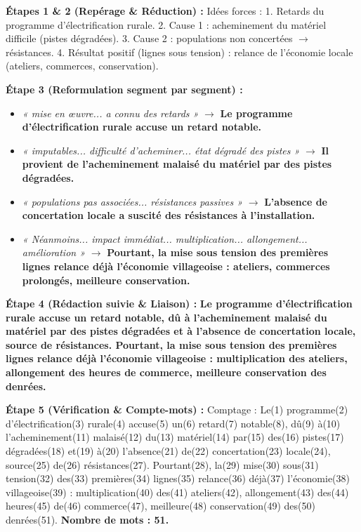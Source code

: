 \documentclass[11pt]{article}
\begin{document}
\begin{corrige}
\textbf{Étapes 1 \& 2 (Repérage \& Réduction) :}
Idées forces : 1. Retards du programme d'électrification rurale. 2. Cause 1 : acheminement du matériel difficile (pistes dégradées). 3. Cause 2 : populations non concertées $\rightarrow$ résistances. 4. Résultat positif (lignes sous tension) : relance de l'économie locale (ateliers, commerces, conservation).

\textbf{Étape 3 (Reformulation segment par segment) :}
\begin{itemize}
    \item \textit{« mise en œuvre... a connu des retards »} $\rightarrow$ \textbf{Le programme d'électrification rurale accuse un retard notable.}
    \item \textit{« imputables... difficulté d'acheminer... état dégradé des pistes »} $\rightarrow$ \textbf{Il provient de l'acheminement malaisé du matériel par des pistes dégradées.}
    \item \textit{« populations pas associées... résistances passives »} $\rightarrow$ \textbf{L'absence de concertation locale a suscité des résistances à l'installation.}
    \item \textit{« Néanmoins... impact immédiat... multiplication... allongement... amélioration »} $\rightarrow$ \textbf{Pourtant, la mise sous tension des premières lignes relance déjà l'économie villageoise : ateliers, commerces prolongés, meilleure conservation.}
\end{itemize}

\textbf{Étape 4 (Rédaction suivie \& Liaison) :}
\textbf{Le programme d'électrification rurale accuse un retard notable, dû à l'acheminement malaisé du matériel par des pistes dégradées et à l'absence de concertation locale, source de résistances. Pourtant, la mise sous tension des premières lignes relance déjà l'économie villageoise : multiplication des ateliers, allongement des heures de commerce, meilleure conservation des denrées.}

\textbf{Étape 5 (Vérification \& Compte-mots) :}
Comptage : Le(1) programme(2) d'électrification(3) rurale(4) accuse(5) un(6) retard(7) notable(8), dû(9) à(10) l'acheminement(11) malaisé(12) du(13) matériel(14) par(15) des(16) pistes(17) dégradées(18) et(19) à(20) l'absence(21) de(22) concertation(23) locale(24), source(25) de(26) résistances(27). Pourtant(28), la(29) mise(30) sous(31) tension(32) des(33) premières(34) lignes(35) relance(36) déjà(37) l'économie(38) villageoise(39) : multiplication(40) des(41) ateliers(42), allongement(43) des(44) heures(45) de(46) commerce(47), meilleure(48) conservation(49) des(50) denrées(51).
\textbf{Nombre de mots : 51.}


\end{corrige}
\end{document}
